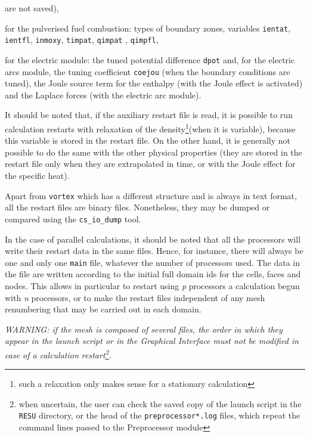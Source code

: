 {{{\begin{list}{-}{}
are not saved),
\item for the pulverised fuel combustion: types of boundary
zones, variables \texttt{ientat}, \texttt{ientfl}, \texttt{inmoxy}, \texttt{timpat}, \texttt{qimpat}
, \texttt{qimpfl},
\item for the electric module: the tuned potential difference \texttt{dpot}%
and, for the electric arcs module, the tuning coefficient \texttt{coejou}%
(when the boundary conditions are tuned), the Joule source term for the enthalpy
(with the Joule effect is activated) and the Laplace forces (with the electric
arc module).
\end{list}

It should be noted that, if the auxiliary restart file is read, it is
possible to run calculation restarts with relaxation of the
density\footnote{such a relaxation only makes sense for a stationary
calculation}(when it is variable), because this variable is stored in the
restart file. On the other hand, it is generally not possible to do the
same with the other physical properties (they are stored in the restart
file only when they are extrapolated in time, or with the Joule effect for the
specific heat).

Apart from \texttt{vortex} which has a different structure and is
always in text format, all the restart files are binary
files. Nonetheless, they may be dumped or compared using
the \texttt{cs\_io\_dump} tool.

In the case of parallel calculations, it should be noted that all the processors
will write their restart data in the same files. Hence, for instance, there will
always be one and only one \texttt{main} file, whatever the number of
processors used. The data in the file are written according to the initial full
domain ids for the cells, faces and nodes. This allows in particular
to restart using {\it p} processors a calculation begun with {\it n} processors,
or to make the restart files independent of any mesh renumbering that may
be carried out in each domain.

{\em WARNING: if the mesh is composed of several files, the order
in which they appear in the launch script or in the Graphical Interface must not
be modified in case of a calculation restart\footnote{when uncertain, the user
can check the saved copy of the launch script in the \texttt{RESU} directory, or
the head of the \texttt{preprocessor*.log} files, which repeat the
command lines passed to the Preprocessor module}.}

}}}
